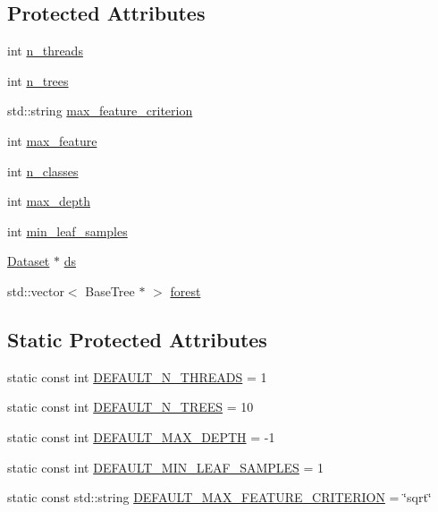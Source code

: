 \subsection*{Protected Attributes}
\begin{DoxyCompactItemize}
\item 
int \hyperlink{class_base_forest_a94fe86e1b426d149a11d100921cea3a4}{n\+\_\+threads}
\item 
int \hyperlink{class_base_forest_a2549a0057ec5419fe1de52ef198125ce}{n\+\_\+trees}
\item 
std\+::string \hyperlink{class_base_forest_a5c651ace1f9d5177cdff38a0ae4048f7}{max\+\_\+feature\+\_\+criterion}
\item 
int \hyperlink{class_base_forest_a07e8b0ed27405f469198f2c4875786c9}{max\+\_\+feature}
\item 
int \hyperlink{class_base_forest_a07e5f38350cc60220dab5661f378b776}{n\+\_\+classes}
\item 
int \hyperlink{class_base_forest_a85cf2e2e202c6e82bf684057181138f6}{max\+\_\+depth}
\item 
int \hyperlink{class_base_forest_a15e0407f3c0fbc4c25e0796c781ff059}{min\+\_\+leaf\+\_\+samples}
\item 
\hyperlink{class_dataset}{Dataset} $\ast$ \hyperlink{class_base_forest_abb0fa17c78f968b583bc15139f409dd5}{ds}
\item 
std\+::vector$<$ Base\+Tree $\ast$ $>$ \hyperlink{class_base_forest_a1a271bf9403c4181aff21e54d1a5e255}{forest}
\end{DoxyCompactItemize}
\subsection*{Static Protected Attributes}
\begin{DoxyCompactItemize}
\item 
static const int \hyperlink{class_base_forest_a36733c1fadd0daadba8e694ee30fd1b6}{D\+E\+F\+A\+U\+L\+T\+\_\+\+N\+\_\+\+T\+H\+R\+E\+A\+D\+S} = 1
\item 
static const int \hyperlink{class_base_forest_a5a697ac9a46154b8f551c012820ffd56}{D\+E\+F\+A\+U\+L\+T\+\_\+\+N\+\_\+\+T\+R\+E\+E\+S} = 10
\item 
static const int \hyperlink{class_base_forest_ac6df44eee4d7ee5913ad57d1d6c79692}{D\+E\+F\+A\+U\+L\+T\+\_\+\+M\+A\+X\+\_\+\+D\+E\+P\+T\+H} = -\/1
\item 
static const int \hyperlink{class_base_forest_a3d000d7f9e2410c73b41b70d8e2e58f8}{D\+E\+F\+A\+U\+L\+T\+\_\+\+M\+I\+N\+\_\+\+L\+E\+A\+F\+\_\+\+S\+A\+M\+P\+L\+E\+S} = 1
\item 
static const std\+::string \hyperlink{class_base_forest_af72e5270729ceae48ca24163a35b46af}{D\+E\+F\+A\+U\+L\+T\+\_\+\+M\+A\+X\+\_\+\+F\+E\+A\+T\+U\+R\+E\+\_\+\+C\+R\+I\+T\+E\+R\+I\+O\+N} = \char`\"{}sqrt\char`\"{}
\end{DoxyCompactItemize}
